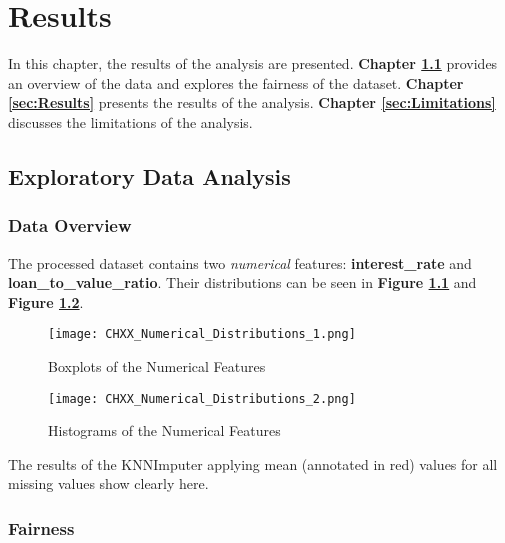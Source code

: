 \chapter{Results}\label{chap:Results}

In this chapter, the results of the analysis are presented. \textbf{Chapter \ref{sec:Exploratory_Data_Analysis}} provides an overview of the data and explores the fairness of the dataset. 
\textbf{Chapter \ref{sec:Results}} presents the results of the analysis. \textbf{Chapter \ref{sec:Limitations}} discusses the limitations of the analysis.

\section{Exploratory Data Analysis}\label{sec:Exploratory_Data_Analysis}



\subsection{Data Overview}\label{subsec:Data_Overview}

The processed dataset contains two \textit{numerical} features: \textbf{interest\_rate} and \textbf{loan\_to\_value\_ratio}.
Their distributions can be seen in \textbf{Figure \ref{fig:CHXX_Numerical_Distributions_1}} and \textbf{Figure \ref{fig:CHXX_Numerical_Distributions_2}}.

\begin{figure}[h]
    \centering
    \texttt{[image: CHXX\_Numerical\_Distributions\_1.png]}
    \caption{Boxplots of the Numerical Features}
    \label{fig:CHXX_Numerical_Distributions_1}
\end{figure}

\begin{figure}[h]
    \centering
    \texttt{[image: CHXX\_Numerical\_Distributions\_2.png]}
    \caption{Histograms of the Numerical Features}
    \label{fig:CHXX_Numerical_Distributions_2}
\end{figure}

The results of the KNNImputer applying mean (annotated in red) values for all missing values show clearly here.



\subsection{Fairness}\label{subsec:Fairness}

